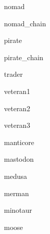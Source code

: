 \documentclass[letterpaper,serif]{module}
\begin{document}
\begin{newmonster}{nomad}\end{newmonster}

\begin{newmonster}{nomad_chain}\end{newmonster}

\begin{newmonster}{pirate}\end{newmonster}

\begin{newmonster}{pirate_chain}\end{newmonster}

\begin{newmonster}{trader}\end{newmonster}

\begin{newmonster}{veteran1}\end{newmonster}

\begin{newmonster}{veteran2}\end{newmonster}

\begin{newmonster}{veteran3}\end{newmonster}

\begin{newmonster}{manticore}\end{newmonster}

\begin{newmonster}{mastodon}\end{newmonster}

\begin{newmonster}{medusa}\end{newmonster}

\begin{newmonster}{merman}\end{newmonster}

\begin{newmonster}{minotaur}\end{newmonster}

\begin{newmonster}{moose}\end{newmonster}
\end{document}
